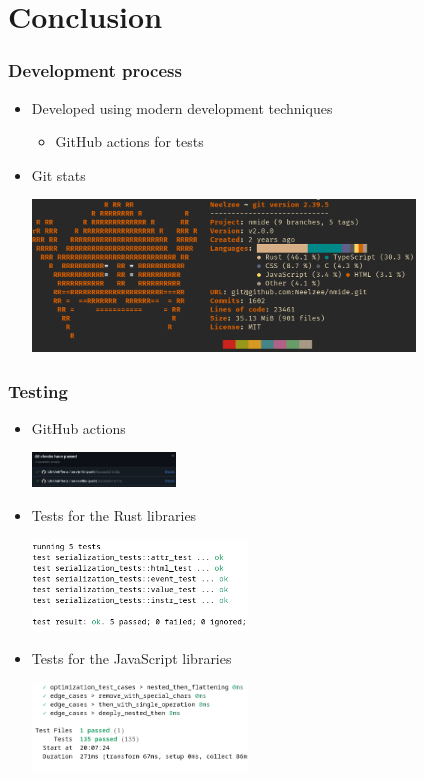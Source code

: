 \section{Conclusion}
\SectionPage

\begin{frame}
  \frametitle{Development process}
  \begin{itemize}
    \item Developed using modern development techniques
    \begin{itemize}
      \item GitHub actions for tests
    \end{itemize}
    \item Git stats
    \begin{center}
      \includegraphics[width=0.8\textwidth]{./pics/onefetch.png}
    \end{center}
  \end{itemize}
\end{frame}

\begin{frame}
  \frametitle{Testing}
  \begin{itemize}
    \item GitHub actions
    \begin{center}
      \includegraphics[width=0.3\textwidth]{./pics/github-actions.png}
    \end{center}
    \item Tests for the Rust libraries
    \begin{center}
      \includegraphics[width=0.45\textwidth]{./pics/librstest.png}
    \end{center}
    \item Tests for the JavaScript libraries
    \begin{center}
      \includegraphics[width=0.45\textwidth]{./pics/libtest.png}
    \end{center}
  \end{itemize}
\end{frame}

